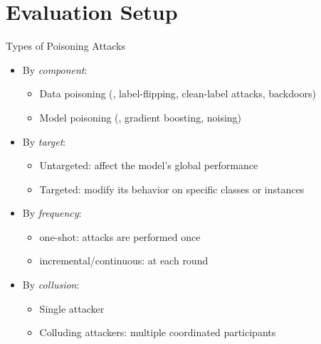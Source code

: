\section{Evaluation Setup}

\begin{frame}
  \sectionpage
\end{frame}

\begin{frame}{Types of Poisoning Attacks}
  \begin{itemize}
    \item By \emph{component}:
    \begin{itemize}
      \item Data poisoning (\eg, \alert<5>{label-flipping}, clean-label attacks, backdoors)
      \item Model poisoning (\eg, gradient boosting, noising)
    \end{itemize}\emph{}

    \pause
    \item By \emph{target}:
    \begin{itemize}
      \item \alert<5>{Untargeted}: affect the model's global performance
      \item \alert<5>{Targeted}: modify its behavior on specific classes or instances
    \end{itemize}

    \pause
    \item By \emph{frequency}:
    \begin{itemize}
      \item one-shot: attacks are performed once
      \item \alert<5>{incremental/continuous}: at each round
    \end{itemize}

    \pause
    \item By \emph{collusion}:
    \begin{itemize}
      \item \alert<5>{Single attacker}
      \item \alert<5>{Colluding attackers}: multiple coordinated participants
    \end{itemize}
  \end{itemize}
\end{frame}
